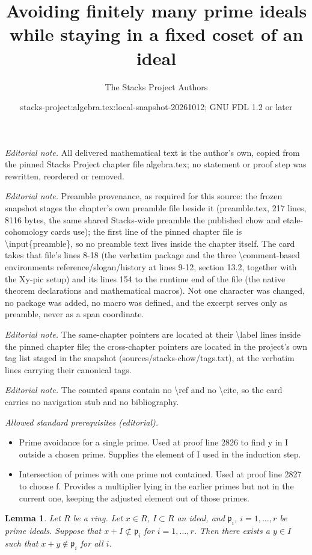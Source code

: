 \documentclass[10pt,a4paper]{amsart}
\title{Avoiding finitely many prime ideals while staying in a fixed coset of an ideal}
\author{The Stacks Project Authors}
\date{stacks-project:algebra.tex:local-snapshot-20261012; GNU FDL 1.2 or later}
\theoremstyle{plain}
\newtheorem{lemma}[subsection]{Lemma}
\theoremstyle{definition}
\theoremstyle{remark}
\numberwithin{equation}{subsection}
\begin{document}
\maketitle
\noindent\textit{Editorial note.} All delivered mathematical text is the author's own, copied from the pinned Stacks Project chapter file algebra.tex; no statement or proof step was rewritten, reordered or removed.\par\medskip
\noindent\textit{Editorial note.} Preamble provenance, as required for this source: the frozen snapshot stages the chapter's own preamble file beside it (preamble.tex, 217 lines, 8116 bytes, the same shared Stacks-wide preamble the published chow and etale-cohomology cards use); the first line of the pinned chapter file is \textbackslash{}input\{preamble\}, so no preamble text lives inside the chapter itself. The card takes that file's lines 8-18 (the verbatim package and the three \textbackslash{}comment-based environments reference/slogan/history at lines 9-12, section 13.2, together with the Xy-pic setup) and its lines 154 to the runtime end of the file (the native theorem declarations and mathematical macros). Not one character was changed, no package was added, no macro was defined, and the excerpt serves only as preamble, never as a span coordinate.\par\medskip
\noindent\textit{Editorial note.} The same-chapter pointers are located at their \textbackslash{}label lines inside the pinned chapter file; the cross-chapter pointers are located in the project's own tag list staged in the snapshot (sources/stacks-chow/tags.txt), at the verbatim lines carrying their canonical tags.\par\medskip
\noindent\textit{Editorial note.} The counted spans contain no \textbackslash{}ref and no \textbackslash{}cite, so the card carries no navigation stub and no bibliography.\par\medskip
\noindent\textit{Allowed standard prerequisites (editorial).}\begin{itemize}
\item Prime avoidance for a single prime. Used at proof line 2826 to find y in I outside a chosen prime. Supplies the element of I used in the induction step.
\item Intersection of primes with one prime not contained. Used at proof line 2827 to choose f. Provides a multiplier lying in the earlier primes but not in the current one, keeping the adjusted element out of those primes.
\end{itemize}\medskip
\begin{lemma}
\label{lemma-silly-silly}
Let $R$ be a ring. Let $x \in R$, $I \subset R$ an ideal, and
$\mathfrak p_i$, $i = 1, \ldots, r$ be prime ideals.
Suppose that $x + I \not \subset \mathfrak p_i$ for
$i = 1, \ldots, r$. Then there exists a $y \in I$
such that $x + y \not \in \mathfrak p_i$ for all $i$.
\end{lemma}
\end{document}
